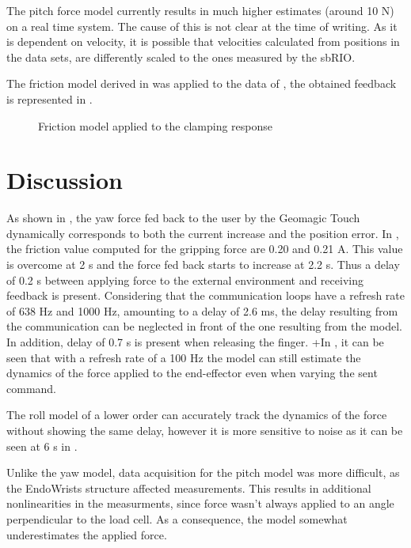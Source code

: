 The pitch force model currently results in much higher estimates (around 10 N) on a real time system. The cause of this is not clear at the time of writing. As it is dependent on velocity, it is possible that velocities calculated from positions in the data sets, are differently scaled to the ones measured by the sbRIO.


The friction model derived in  was applied to the data of , the obtained feedback is represented in .
\begin{figure}[H]

\caption{Friction model applied to the clamping response}
\label{fig:friction_validation}
\end{figure}


\section{Discussion}


As shown in , the yaw force fed back to the user by the Geomagic Touch dynamically corresponds to both the current increase and the position error. In , the friction value computed for the gripping force are 0.20 and 0.21 A. This value is overcome at 2 s and the force fed back starts to increase at 2.2 s. Thus a delay of 0.2 s between applying force to the external environment and receiving feedback is present. Considering that the communication loops have a refresh rate of 638 Hz and 1000 Hz, amounting to a delay of 2.6 ms, the delay resulting from the communication can be neglected in front of the one resulting from the model. In addition, delay of 0.7 s is present when releasing the finger.
 +In , it can be seen that with a refresh rate of a 100 Hz the model can still estimate the dynamics of the force applied to the end-effector even when varying the sent command.
 
The roll model of a lower order can accurately track the dynamics of the force without showing the same delay, however it is more sensitive to noise as it can be seen at 6 s in .

Unlike the yaw model, data acquisition for the pitch model was more difficult, as the EndoWrists structure affected measurements.
This results in additional nonlinearities in the measurments, since force wasn't always applied to an angle perpendicular to the load cell.
As a consequence, the model somewhat underestimates the applied force.

